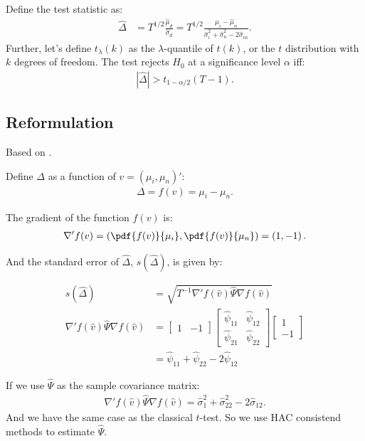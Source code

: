 \documentclass[12pt,oneside,a4paper]{article}
\begin{document}
Define the test statistic as:
\begin{align}
\hat{\Delta} &= T^{1/2} \frac{\hat{\mu}_{d}}{\hat{\sigma}_{d}} = 
 T^{1/2} \frac{\hat{\mu}_{i} - \hat{\mu}_{n}}{\hat{\sigma}^2_{i} + \hat{\sigma}^2_{n} - 2\hat{\sigma}_{in}}.
\end{align}
Further, let's define $t_{\lambda}(k)$ as the $\lambda$-quantile of $t(k)$, or the $t$ distribution with $k$ degrees of freedom.
The test rejects $H_{0}$ at a significance level $\alpha$ iff:
\begin{align*}
	|\hat{\Delta}| > t_{1-\alpha/2}(T-1).
\end{align*}

\subsection{Reformulation}
Based on \cite{lw2018}.

Define $\Delta$ as a function of $v = (\mu_{i}, \mu_{n})'$:
\begin{align*}
\Delta = f(v) = \mu_{i} - \mu_{n}.
\end{align*}

The gradient of the function $f(v)$ is:
\begin{align}
\nabla' f(v) =
\left( 
\pdf{f(v)}{\mu_{i}},
\pdf{f(v)}{\mu_{n}}
\right) = \left( 1, -1 \right).
\end{align}

And the standard error of $\hat{\Delta}$, $s(\hat{\Delta})$, is given by:

\begin{align*}
s(\hat{\Delta}) &= \sqrt{T^{-1} \nabla'f(\hat{v}) \hat{\Psi} \nabla f(\hat{v})} 
\\
\nabla'f(\hat{v}) \hat{\Psi} \nabla f(\hat{v}) &=
\begin{bmatrix} 1 & -1 \end{bmatrix}
\begin{bmatrix}
\hat{\psi}_{11} &  \hat{\psi}_{12}
\\            
\hat{\psi}_{21} &  \hat{\psi}_{22}
\end{bmatrix}
\begin{bmatrix} 1 \\  -1 \end{bmatrix}
\\
&= \hat{\psi}_{11} + \hat{\psi}_{22} -2\hat{\psi}_{12}
\end{align*}

If we use $\hat{\Psi}$ as the sample covariance matrix:
\begin{align*}
\nabla'f(\hat{v}) \hat{\Psi} \nabla f(\hat{v})= \hat{\sigma}_{1}^2 + \hat{\sigma}_{22}^{2} -2\hat{\sigma}_{12}.
\end{align*}
And we have the same case as the classical $t$-test.
So we use HAC consistend methods to estimate $\hat{\Psi}$.
\end{document}
